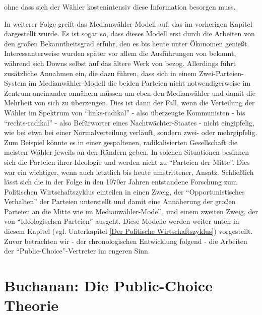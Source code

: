 ohne dass sich der Wähler kostenintensiv diese Information besorgen muss.

In weiterer Folge greift \textcite[S. 142]{Downs1957} das Medianwähler-Modell auf, das im vorherigen Kapitel dargestellt wurde. Es ist sogar so, dass dieses Modell erst durch die Arbeiten von \textcite{Downs1957, Downs1957b} den großen Bekanntheitsgrad erfuhr, den es bis heute unter Ökonomen genießt. Interessanterweise wurden später vor allem die Ausführungen von \textcite{Black1948a, Black1948b} bekannt, während sich Downs selbst auf das ältere Werk von \textcite{Hotelling1929} bezog. Allerdings führt \textcite[S. 142]{Downs1957} zusätzliche Annahmen ein, die dazu führen, dass sich in einem Zwei-Parteien-System im Medianwähler-Modell die beiden Parteien nicht notwendigerweise im Zentrum aneinander annähern müssen um eben den Medianwähler und damit die Mehrheit von sich zu überzeugen. Dies ist dann der Fall, wenn die Verteilung der Wähler im Spektrum von "`links-radikal"' - also überzeugte Kommunisten -  bis "`rechts-radikal"' - also Befürworter eines Nachtwächter-Staates - nicht eingipfelig, wie bei etwa bei einer Normalverteilung verläuft, sondern zwei- oder mehrgipfelig. Zum Beispiel könnte es in einer gespaltenen, radikalisierten Gesellschaft die meisten Wähler jeweils an den Rändern geben. In solchen Situationen besinnen sich die Parteien ihrer Ideologie und werden nicht zu "`Parteien der Mitte"'. Dies war ein wichtiger, wenn auch letztlich bis heute umstrittener, Ansatz. Schließlich lässt sich die in der Folge in den 1970er Jahren entstandene Forschung zum Politischen Wirtschaftszyklus einteilen in einen Zweig, der "`Opportunistisches Verhalten"' der Parteien unterstellt und damit eine Annäherung der großen Parteien an die Mitte wie im Medianwähler-Modell, und einem zweiten Zweig, der von "`Ideologischen Parteien"' ausgeht. Diese Modelle werden weiter unten in diesem Kapitel (vgl. Unterkapitel \ref{Der Politische Wirtschaftszyklus}) vorgestellt. Zuvor betrachten wir - der chronologischen Entwicklung folgend - die Arbeiten der "`Public-Choice"'-Vertreter im engeren Sinn. 

\section{Buchanan: Die Public-Choice Theorie}
\label{Pol_Econ}

